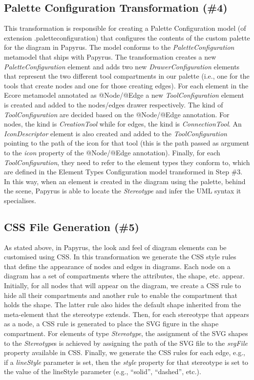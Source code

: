 \subsection{Palette Configuration Transformation (\#4)}
\label{sec:paletteGeneration}
This transformation is responsible for creating a Palette Configuration model (of extension .paletteconfiguration) that configures the contents of the custom palette for the diagram in Papyrus. 
The model conforms to the \textit{PaletteConfiguration} metamodel that ships with Papyrus.
The transformation creates a new \textit{PaletteConfiguration} element and adds two new \textit{DrawerConfiguration} elements that represent the two different tool compartments in our palette (i.e., one for the tools that create nodes and one for those creating edges). 
For each element in the Ecore metamodel annotated as @Node/@Edge a new \textit{ToolConfiguration} element is created and added to the nodes/edges drawer respectively. 
The kind of \textit{ToolConfiguration} are decided based on the @Node/@Edge annotation. For nodes, the kind is \textit{CreationTool} while for edges, the kind is \textit{ConnectionTool}.
An \textit{IconDescriptor} element is also created and added to the \textit{ToolConfiguration} pointing to the path of the icon for that tool (this is the path passed as argument to the \textit{icon} property of the @Node/@Edge annotation).
Finally, for each \textit{ToolConfiguration}, they need to refer to the element types they conform to, which are defined in the Element Types Configuration model transformed in Step \#3. 
In this way, when an element is created in the diagram using the palette, behind the scene, Papyrus is able to locate the \textit{Stereotype} and infer the UML syntax it specialises.

\subsection{CSS File Generation (\#5)}
\label{sec:cssGeneration}
As stated above, in Papyrus, the look and feel of diagram elements can be customised using CSS. 
In this transformation we generate the CSS style rules that define the appearance of nodes and edges in diagrams. 
Each node on a diagram has a set of compartments where the attributes, the shape, etc. appear. 
Initially, for all nodes that will appear on the diagram, we create a CSS rule to hide all their compartments and another rule to enable the compartment that holds the shape. 
The latter rule also hides the default shape inherited from the meta-element that the stereotype extends. 
Then, for each stereotype that appears as a node, a CSS rule is generated to place the SVG figure in the shape compartment. 
For elements of type \textit{Stereotype}, the assignment of the SVG shapes to the \textit{Stereotype}s is achieved by assigning the path of the SVG file to the \textit{svgFile} property available in CSS. 
Finally, we generate the CSS rules for each edge, e.g., if a \emph{lineStyle} parameter is set, then the \textit{style} property for that stereotype is set to the value of the lineStyle parameter (e.g., ``solid'', ``dashed'', etc.).


